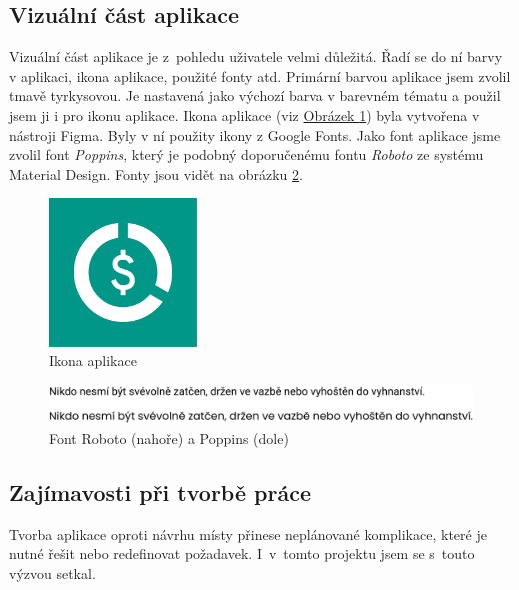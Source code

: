 \documentclass[
  biblatex,
  figures=true,
  tables=false,
  glossaries,
  index
]{kidiplom}
\begin{document}
\subsection{Vizuální část aplikace}
Vizuální část aplikace je z~pohledu uživatele velmi důležitá. Řadí se do ní barvy v aplikaci, ikona aplikace, použité fonty atd. Primární barvou aplikace jsem zvolil tmavě tyrkysovou. Je nastavená jako výchozí barva v barevném tématu a použil jsem ji i pro ikonu aplikace. Ikona aplikace (viz \hyperref[fig:app-icon]{Obrázek \ref{fig:appicon}}) byla vytvořena v nástroji Figma. Byly v ní použity ikony z Google Fonts. Jako font aplikace jsme zvolil font \textit{Poppins}, který je podobný doporučenému fontu \textit{Roboto} ze systému Material Design. Fonty jsou vidět na obrázku \ref{fig:font}. 

\begin{figure}
  \centering
  \includegraphics[width=0.35\textwidth]{images/app-icon.pdf}
  \caption{Ikona aplikace}
  \label{fig:appicon}
\end{figure}

\begin{figure}
  \centering
  \includegraphics[width=\textwidth]{images/font-comparision.pdf}
  \caption{Font Roboto (nahoře) a Poppins (dole)}
  \label{fig:font}
\end{figure}

\subsection{Zajímavosti při tvorbě práce}
Tvorba aplikace oproti návrhu místy přinese neplánované komplikace, které je nutné řešit nebo redefinovat požadavek. I~v~tomto projektu jsem se s~touto výzvou setkal.
\end{document}
